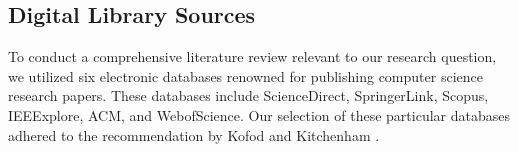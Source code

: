 \subsection{Digital Library Sources}

To conduct a comprehensive literature review relevant  to our research question, we utilized six electronic databases renowned for publishing computer science research papers. These databases include ScienceDirect, SpringerLink, Scopus, IEEExplore, ACM, and WebofScience. Our selection of these particular databases adhered to the recommendation by Kofod \cite{kofod-petersen_how_nodate} and Kitchenham \cite{kitchenham_guidelines_2007}.


